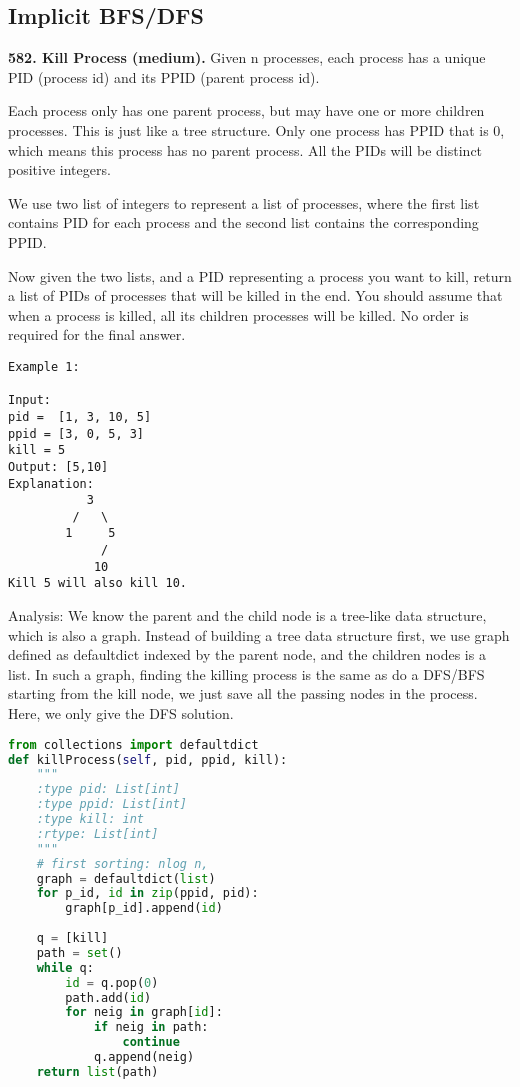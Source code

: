 \documentclass[../main.tex]{subfiles}
\begin{document}
\subsection{Implicit BFS/DFS}
\begin{examples}[resume]
\item \textbf{582. Kill Process (medium).} Given n processes, each process has a unique PID (process id) and its PPID (parent process id).

Each process only has one parent process, but may have one or more children processes. This is just like a tree structure. Only one process has PPID that is 0, which means this process has no parent process. All the PIDs will be distinct positive integers.

We use two list of integers to represent a list of processes, where the first list contains PID for each process and the second list contains the corresponding PPID.

Now given the two lists, and a PID representing a process you want to kill, return a list of PIDs of processes that will be killed in the end. You should assume that when a process is killed, all its children processes will be killed. No order is required for the final answer.
\begin{lstlisting}[numbers=none]
Example 1:

Input: 
pid =  [1, 3, 10, 5]
ppid = [3, 0, 5, 3]
kill = 5
Output: [5,10]
Explanation: 
           3
         /   \
        1     5
             /
            10
Kill 5 will also kill 10.
\end{lstlisting}

Analysis: We know the parent and the child node is a tree-like data structure, which is also a graph. Instead of building a tree data structure first, we use graph defined as defaultdict indexed by the parent node, and the children nodes is a list. In such a graph, finding the killing process is the same as do a DFS/BFS starting from the kill node, we just save all the passing nodes in the process. Here, we only give the DFS solution.  
\begin{lstlisting}[language=Python]
from collections import defaultdict
def killProcess(self, pid, ppid, kill):
    """
    :type pid: List[int]
    :type ppid: List[int]
    :type kill: int
    :rtype: List[int]
    """
    # first sorting: nlog n, 
    graph = defaultdict(list)
    for p_id, id in zip(ppid, pid):
        graph[p_id].append(id)
    
    q = [kill]
    path = set()
    while q:
        id = q.pop(0)
        path.add(id)
        for neig in graph[id]:
            if neig in path:
                continue
            q.append(neig)
    return list(path)    
\end{lstlisting}
\end{examples}
\end{document}
